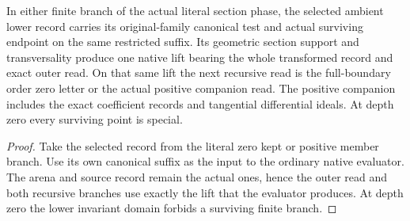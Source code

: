\begin{theorem}
\label{hir:g1-selected-section-ordinary-native}
\leanok
In either finite branch of the actual literal section phase, the
selected ambient lower record carries its original-family canonical
test and actual surviving endpoint on the same restricted suffix.
Its geometric section support and transversality produce one native
lift bearing the whole transformed record and exact outer read.
On that same lift the next recursive read is the full-boundary order
zero letter or the actual positive companion read. The positive
companion includes the exact coefficient records and tangential
differential ideals. At depth zero every surviving point is special.
\end{theorem}
\begin{proof}
Take the selected record from the literal zero kept or positive
member branch. Use its own canonical suffix as the input to the
ordinary native evaluator. The arena and source record remain the
actual ones, hence the outer read and both recursive branches
use exactly the lift that the evaluator produces. At depth zero
the lower invariant domain forbids a surviving finite branch.
\end{proof}


